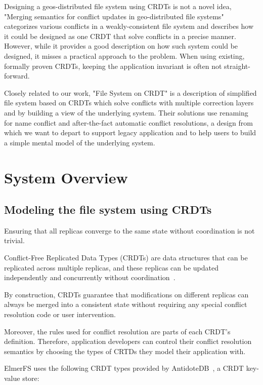 \documentclass[sigconf, 10pt]{acmart}
\begin{document}
Designing a geos-distributed file system using CRDTs is not a novel idea, "Merging semantics for conflict updates in geo-distributed file systems"\cite{tao2015merging} categorizes various conflicts in a weakly-consistent file system and describes how it could be designed as one CRDT that solve conflicts in a precise manner.
However, while it provides a good description on how such system could be designed, it misses a practical approach to the problem. When using existing, formally proven CRDTs, keeping the application invariant is often not straight-forward.

Closely related to our work, "File System on CRDT"\cite{ahmed2012file} is a description of simplified file system based on CRDTs which solve conflicts with multiple correction layers and by building a view of the underlying system. Their solutions use renaming for name conflict and after-the-fact automatic conflict resolutions, a design from which we want to depart to support legacy application and to help users to build a simple mental model of the underlying system.

\section{System Overview}

\subsection{Modeling the file system using CRDTs}

Ensuring that all replicas converge to the same state without coordination
is not trivial.

Conflict-Free Replicated Data Types (CRDTs) are data structures that
can be replicated across multiple replicas,
and these replicas can be updated independently and concurrently without coordination~\cite{shapiro2011conflict}.

By construction, CRDTs guarantee that modifications on different
replicas can always be merged into a consistent state without requiring
any special conflict resolution code or user intervention.

Moreover, the rules used for conflict resolution are parts of each CRDT's definition.
Therefore, application developers can control their conflict resolution semantics by
choosing the types of CRTDs they model their application with.

ElmerFS uses the following CRDT types provided by AntidoteDB~\cite{akkoorath2016antidote, akkoorath2016cure}, a CRDT key-value store:
\end{document}
